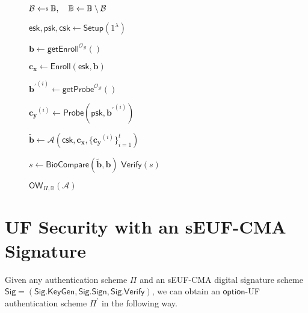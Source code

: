 \begin{figure}[h]
\centering

	\begin{minipage}[t]{0.55\textwidth}
	\begin{algorithm}[H]
	\caption{$\textsf{OW}_{\Pi, \mathbb{B}}(\mathcal{A})$}
	\label{alg:ow_game}
	\begin{algorithmic}[1]

		\State $\mathcal{B} \getsdollar \mathbb{B}, \quad \mathbb{B} \gets \mathbb{B} \setminus \mathcal{B}$

		\State $\textsf{esk}, \textsf{psk}, \textsf{csk} \gets \textsf{Setup}(1^\lambda)$

		\State $\mathbf{b} \gets \textsf{getEnroll}^{\mathcal{O}_{\mathcal{B}}}()$

		\State $\mathbf{c_x} \gets \textsf{Enroll}(\textsf{esk}, \mathbf{b})$


			\State ${\mathbf{b}^\prime}^{(i)} \gets \textsf{getProbe}^{\mathcal{O}_{\mathcal{B}}}() $
		
			\State $\mathbf{c_y}^{(i)} \gets \textsf{Probe}( \textsf{psk}, {\mathbf{b}^\prime}^{(i)} )$

		\EndFor
	
			\State $\mathbf{\tilde{b}} \gets \mathcal{A}( \textsf{csk}, \mathbf{c_x}, \{ \mathbf{c_y}^{(i)} \}_{i=1}^t )$

		\State $s \gets \textsf{BioCompare}( \mathbf{\tilde{b}}, \mathbf{b})$
		\State \Return $ \textsf{Verify}(s) $
	\end{algorithmic}
	\end{algorithm}
	\end{minipage}

\label{fig:ow_game}
\end{figure}


\section{UF Security with an sEUF-CMA Signature}

Given any authentication scheme $\Pi$ and an sEUF-CMA digital signature scheme $\textsf{Sig} = (\textsf{Sig.KeyGen}, \textsf{Sig.Sign}, \textsf{Sig.Verify})$, we can obtain an $\textsf{option}$-UF authentication scheme $\Pi^\prime$ in the following way.

